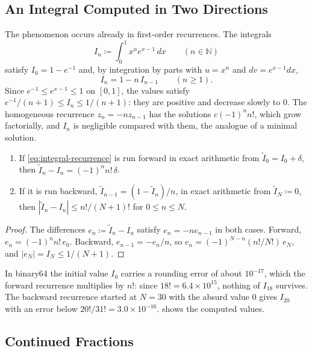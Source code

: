 \subsection{An Integral Computed in Two Directions}

The phenomenon occurs already in first-order recurrences. The integrals
\[
I_n\coloneqq\int_0^1x^ne^{x-1}\,dx\qquad(n\in\mathbb N)
\]
satisfy $I_0=1-e^{-1}$ and, by integration by parts with $u=x^n$ and $dv=e^{x-1}dx$,
\begin{equation}
I_n=1-n\,I_{n-1}\qquad(n\ge1).
\label{eq:integral-recurrence}
\end{equation}
Since $e^{-1}\le e^{x-1}\le1$ on $[0,1]$, the values satisfy $e^{-1}/(n+1)\le I_n\le1/(n+1)$: they are positive and decrease slowly to $0$. The homogeneous recurrence $z_n=-nz_{n-1}$ has the solutions $c(-1)^nn!$, which grow factorially, and $I_n$ is negligible compared with them, the analogue of a minimal solution.

\begin{proposition}
\label{prop:integral-two-directions}
\leavevmode
\begin{enumerate}
\item If \eqref{eq:integral-recurrence} is run forward in exact arithmetic from $\tilde I_0=I_0+\delta$, then $\tilde I_n-I_n=(-1)^nn!\,\delta$.
\item If it is run backward, $\tilde I_{n-1}=(1-\tilde I_n)/n$, in exact arithmetic from $\tilde I_N\coloneqq0$, then $|\tilde I_n-I_n|\le n!/(N+1)!$ for $0\le n\le N$.
\end{enumerate}
\end{proposition}

\begin{proof}
The differences $e_n\coloneqq\tilde I_n-I_n$ satisfy $e_n=-ne_{n-1}$ in both cases. Forward, $e_n=(-1)^nn!\,e_0$. Backward, $e_{n-1}=-e_n/n$, so $e_n=(-1)^{N-n}(n!/N!)\,e_N$, and $|e_N|=I_N\le1/(N+1)$.
\end{proof}

In binary64 the initial value $I_0$ carries a rounding error of about $10^{-17}$, which the forward recurrence multiplies by $n!$: since $18!=6.4\times10^{15}$, nothing of $I_{18}$ survives. The backward recurrence started at $N=30$ with the absurd value $0$ gives $I_{20}$ with an error below $20!/31!=3.0\times10^{-16}$.  shows the computed values.

\subsection{Continued Fractions}

